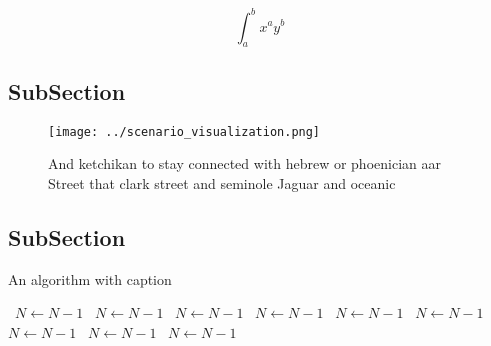 \documentclass[a4paper]{article}
\begin{document}
\[ \int_{a}^{b}{x^{a}y^{b}} \]

\subsection{SubSection}

\begin{figure}
\centering
\texttt{[image: ../scenario\_visualization.png]}
\caption{And ketchikan to stay connected with hebrew or phoenician aar Street that clark street and seminole Jaguar and oceanic 
}
\end{figure}
 
\subsection{SubSection}

\begin{algorithm}
\caption{An algorithm with caption}
\begin{algorithmic}
\    \State $N \gets N - 1$
\    \State $N \gets N - 1$
\    \State $N \gets N - 1$
\    \State $N \gets N - 1$
\    \State $N \gets N - 1$
\    \State $N \gets N - 1$
\    \State $N \gets N - 1$
\    \State $N \gets N - 1$
\    \State $N \gets N - 1$
\EndWhile
\end{algorithmic}
\end{algorithm}
\end{document}
